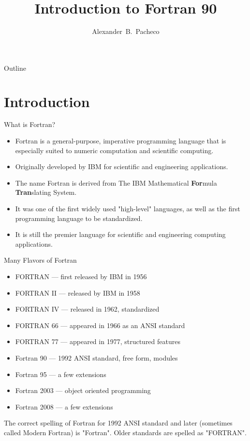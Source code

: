 \documentclass[10pt,t]{beamer}
\title[F90]{Introduction to Fortran 90}
\author[Alex Pacheco]{\large{Alexander~B.~Pacheco}}
\institute[Research Computing]{\href{http://researchcomputing.lehigh.edu}{Research Computing} \\Lehigh University}
\date{}%
\begin{document}
\frame{\titlepage}

\begin{frame}{Outline}
  \tableofcontents
\end{frame}


\section{Introduction}
\begin{frame}{What is Fortran?}
  \begin{itemize}
    \item Fortran is a general-purpose, imperative programming language that is especially suited to numeric computation and scientific computing.
    \item Originally developed by IBM for scientific and engineering applications.
    \item The name Fortran is derived from The IBM Mathematical \textbf{For}mula \textbf{Tran}slating System.
    \item It was one of the first widely used "high-level" languages, as well as the first programming language to be standardized. 
    \item It is still the premier language for scientific and engineering computing applications.
  \end{itemize}
\end{frame}

\begin{frame}{Many Flavors of Fortran}
  \begin{itemize}
    \item FORTRAN --- first released by IBM in 1956
    \item FORTRAN II --- released by IBM in 1958
    \item FORTRAN IV --- released in 1962, standardized
    \item FORTRAN 66 --- appeared in 1966 as an ANSI standard
    \item FORTRAN 77 --- appeared in 1977, structured features
    \item Fortran 90 --- 1992 ANSI standard, free form, modules
    \item Fortran 95 --- a few extensions
    \item Fortran 2003 --- object oriented programming
    \item Fortran 2008 --- a few extensions
  \end{itemize}
  The correct spelling of Fortran for 1992 ANSI standard and later (sometimes called Modern Fortran) is "Fortran". Older standards are spelled as "FORTRAN". 
\end{frame}
\end{document}
